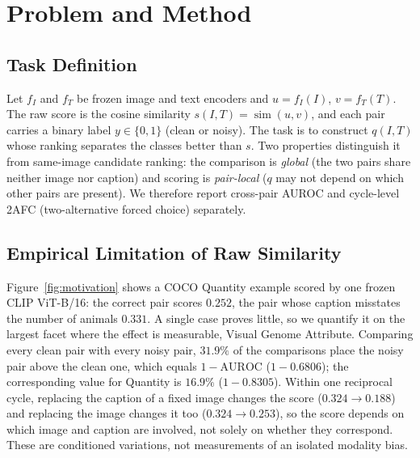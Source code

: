 \section{Problem and Method}
\label{sec:problem}

\subsection{Task Definition}
Let $f_I$ and $f_T$ be frozen image and text encoders and $u=f_I(I)$, $v=f_T(T)$.
The raw score is the cosine similarity $s(I,T)=\operatorname{sim}(u,v)$, and each
pair carries a binary label $y\in\{0,1\}$ (clean or noisy). The task is to construct
$q(I,T)$ whose ranking separates the classes better than $s$. Two properties
distinguish it from same-image candidate ranking: the comparison is \emph{global}
(the two pairs share neither image nor caption) and scoring is \emph{pair-local}
($q$ may not depend on which other pairs are present). We therefore report cross-pair
AUROC and cycle-level 2AFC (two-alternative forced choice) separately.

\subsection{Empirical Limitation of Raw Similarity}
Figure~\ref{fig:motivation} shows a COCO Quantity example scored by one frozen CLIP
ViT-B/16: the correct pair scores $0.252$, the pair whose caption misstates the
number of animals $0.331$. A single case proves little, so we quantify it on the
largest facet where the effect is measurable, Visual Genome Attribute. Comparing every clean
pair with every noisy pair, $31.9\%$ of the comparisons place the noisy pair above
the clean one, which equals $1-\mathrm{AUROC}$ ($1-0.6806$); the corresponding value
for Quantity is $16.9\%$ ($1-0.8305$). Within one reciprocal cycle, replacing the
caption of a fixed image changes the score ($0.324\to0.188$) and replacing the image
changes it too ($0.324\to0.253$), so the score depends on which image and caption are
involved, not solely on whether they correspond. These are conditioned variations,
not measurements of an isolated modality bias.

